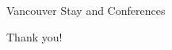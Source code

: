 \begin{frame}[t]{Vancouver Stay and Conferences}
\end{frame}

\begin{frame}[t]{Thank you!}
\end{frame}
